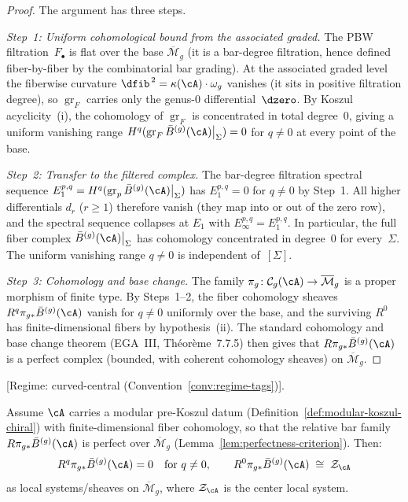 \begin{proof}
The argument has three steps.

\emph{Step~1: Uniform cohomological bound from the associated graded.}
The PBW filtration~$F_\bullet$ is flat over the base
$\overline{\mathcal{M}}_g$ (it is a bar-degree filtration,
hence defined fiber-by-fiber by the combinatorial bar grading).
At the associated graded level the fiberwise
curvature $\dfib^{\,2} = \kappa(\cA)\cdot\omega_g$ vanishes
(it sits in positive filtration degree), so
$\operatorname{gr}_F$ carries only the genus-$0$
differential~$\dzero$.  By Koszul acyclicity~(i), the
cohomology of $\operatorname{gr}_F$ is concentrated in total
degree~$0$, giving a uniform vanishing range
$H^q(\operatorname{gr}_F\bar{B}^{(g)}(\cA)\big|_\Sigma) = 0$
for $q \neq 0$ at every point of the base.

\emph{Step~2: Transfer to the filtered complex.}
The bar-degree filtration spectral sequence
$E_1^{p,q} =
H^q(\operatorname{gr}_p\bar{B}^{(g)}(\cA)\big|_\Sigma)$
has $E_1^{p,q} = 0$ for $q \neq 0$ by Step~1.  All higher
differentials $d_r$ ($r \geq 1$) therefore vanish (they map into
or out of the zero row), and the spectral sequence collapses at
$E_1$ with $E_\infty^{p,q} = E_1^{p,q}$.  In particular, the
full fiber complex $\bar{B}^{(g)}(\cA)\big|_\Sigma$ has
cohomology concentrated in degree~$0$ for every~$\Sigma$.
The uniform vanishing range $q \neq 0$ is independent
of~$[\Sigma]$.

\emph{Step~3: Cohomology and base change.}
The family
$\pi_g\colon \mathcal{C}_g(\cA) \to \overline{\mathcal{M}}_g$
is a proper morphism of finite type.  By Steps~1--2, the fiber
cohomology sheaves $R^q\pi_{g*}\bar{B}^{(g)}(\cA)$ vanish for
$q \neq 0$ uniformly over the base, and the surviving $R^0$ has
finite-dimensional fibers by hypothesis~(ii).  The standard
cohomology and base change theorem
(EGA~III, Th\'eor\`eme~7.7.5)
then gives that $R\pi_{g*}\bar{B}^{(g)}(\cA)$ is a perfect
complex (bounded, with coherent cohomology sheaves) on
$\overline{\mathcal{M}}_g$.
\end{proof}

\begin{theorem}
\label{thm:fiber-center-identification}
\textup{[}Regime: curved-central
\textup{(}Convention~\textup{\ref{conv:regime-tags})].}

\smallskip\noindent
Assume $\cA$ carries a modular pre-Koszul datum
\textup{(}Definition~\textup{\ref{def:modular-koszul-chiral})}
with finite-dimensional fiber cohomology, so that the relative bar
family $R\pi_{g*}\bar{B}^{(g)}(\cA)$ is perfect over
$\overline{\mathcal{M}}_g$
\textup{(}Lemma~\textup{\ref{lem:perfectness-criterion})}.
Then:
\begin{equation}\label{eq:fiber-center}
R^q\pi_{g*}\bar{B}^{(g)}(\cA) = 0
\quad\text{for } q \neq 0,
\qquad
R^0\pi_{g*}\bar{B}^{(g)}(\cA)
\;\cong\; \mathcal{Z}_{\cA}
\end{equation}
as local systems/sheaves on $\overline{\mathcal{M}}_g$,
where $\mathcal{Z}_{\cA}$ is the center local system.
\end{theorem}

